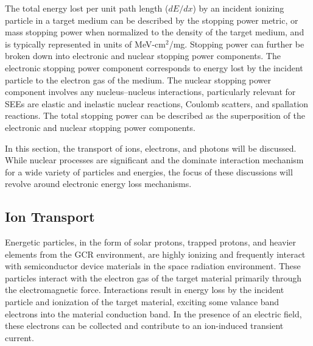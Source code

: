 The total energy lost per unit path length ($dE/dx$) by an incident ionizing particle in a target medium can be described by the stopping power metric, or mass stopping power when normalized to the density of the target medium, and is typically represented in units of MeV-cm$^2$/mg.
Stopping power can further be broken down into electronic and nuclear stopping power components.
The electronic stopping power component corresponds to energy lost by the incident particle to the electron gas of the medium.
The nuclear stopping power component involves any nucleus--nucleus interactions, particularly relevant for SEEs are elastic and inelastic nuclear reactions, Coulomb scatters, and spallation reactions.
The total stopping power can be described as the superposition of the electronic and nuclear stopping power components.

In this section, the transport of ions, electrons, and photons will be discussed.
While nuclear processes are significant and the dominate interaction mechanism for a wide variety of particles and energies, the focus of these discussions will revolve around electronic energy loss mechanisms.

\subsection{Ion Transport} %
\label{sub:ion_transport}
Energetic particles, in the form of solar protons, trapped protons, and heavier elements from the GCR environment, are highly ionizing and frequently interact with semiconductor device materials in the space radiation environment.
These particles interact with the electron gas of the target material primarily through the electromagnetic force.
Interactions result in energy loss by the incident particle and ionization of the target material, exciting some valance band electrons into the material conduction band.
In the presence of an electric field, these electrons can be collected and contribute to an ion-induced transient current.

